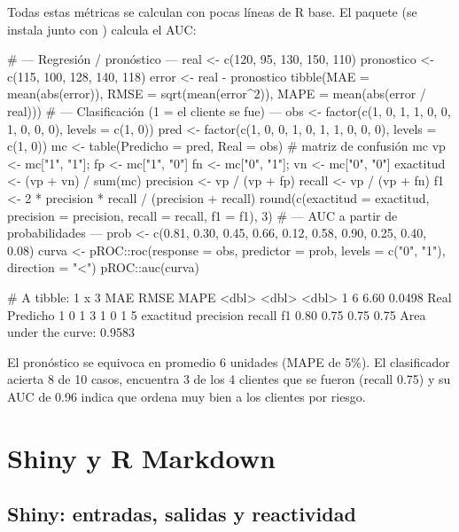 Todas estas métricas se calculan con pocas líneas de R base. El paquete
 (se instala junto con ) calcula el AUC:

\begin{rcode}[title={Métricas de regresión y de clasificación a mano}]
# --- Regresión / pronóstico ---
real       <- c(120, 95, 130, 150, 110)
pronostico <- c(115, 100, 128, 140, 118)
error <- real - pronostico
tibble(MAE  = mean(abs(error)),
       RMSE = sqrt(mean(error^2)),
       MAPE = mean(abs(error / real)))
# --- Clasificación (1 = el cliente se fue) ---
obs  <- factor(c(1, 0, 1, 1, 0, 0, 1, 0, 0, 0), levels = c(1, 0))
pred <- factor(c(1, 0, 0, 1, 0, 1, 1, 0, 0, 0), levels = c(1, 0))
mc <- table(Predicho = pred, Real = obs)      # matriz de confusión
mc
vp <- mc["1", "1"]; fp <- mc["1", "0"]
fn <- mc["0", "1"]; vn <- mc["0", "0"]
exactitud <- (vp + vn) / sum(mc)
precision <- vp / (vp + fp)
recall    <- vp / (vp + fn)
f1        <- 2 * precision * recall / (precision + recall)
round(c(exactitud = exactitud, precision = precision,
        recall = recall, f1 = f1), 3)
# --- AUC a partir de probabilidades ---
prob <- c(0.81, 0.30, 0.45, 0.66, 0.12, 0.58, 0.90, 0.25, 0.40, 0.08)
curva <- pROC::roc(response = obs, predictor = prob,
                   levels = c("0", "1"), direction = "<")
pROC::auc(curva)
\end{rcode}
\begin{rsalida}
# A tibble: 1 x 3
    MAE  RMSE   MAPE
  <dbl> <dbl>  <dbl>
1     6  6.60 0.0498
        Real
Predicho 1 0
       1 3 1
       0 1 5
exactitud precision    recall        f1
     0.80      0.75      0.75      0.75
Area under the curve: 0.9583
\end{rsalida}

El pronóstico se equivoca en promedio 6 unidades (MAPE de 5\%). El
clasificador acierta 8 de 10 casos, encuentra 3 de los 4 clientes que se
fueron (recall 0.75) y su AUC de 0.96 indica que ordena muy bien a los
clientes por riesgo.

\section{Shiny y R Markdown}
\label{sec:ap-b-shiny}

\subsection{Shiny: entradas, salidas y reactividad}

